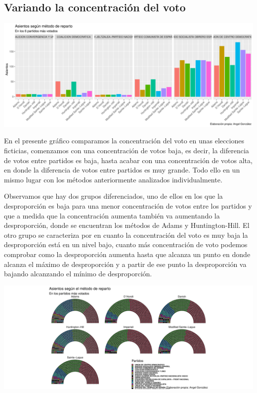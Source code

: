 \documentclass[12pt,a4paper,]{book}
\numberwithin{dummy}{section}
\theoremstyle{ocrenumbox}
\theoremstyle{blacknumex}
\theoremstyle{blacknumbox}
\theoremstyle{ocrenum}
\theoremstyle{ocrenum}
\begin{document}
\hypertarget{variando-la-concentraciuxf3n-del-voto}{%
\subsection{Variando la concentración del
voto}\label{variando-la-concentraciuxf3n-del-voto}}

\begin{center}\includegraphics[width=0.95\linewidth]{figurasR/unnamed-chunk-68-1} \end{center}

En el presente gráfico comparamos la concentración del voto en unas
elecciones ficticias, comenzamos con una concentración de votos baja, es
decir, la diferencia de votos entre partidos es baja, hasta acabar con
una concentración de votos alta, en donde la diferencia de votos entre
partidos es muy grande. Todo ello en un mismo lugar con los métodos
anteriormente analizados individualmente.

Observamos que hay dos grupos diferenciados, uno de ellos en los que la
desproporción es baja para una menor concentración de votos entre los
partidos y que a medida que la concentración aumenta también va
aumentando la desproporción, donde se encuentran los métodos de Adams y
Huntington-Hill. El otro grupo se caracteriza por en cuanto la
concentración del voto es muy baja la desproporción está en un nivel
bajo, cuanto más concentración de voto podemos comprobar como la
desproporción aumenta hasta que alcanza un punto en donde alcanza el
máximo de desproporción y a partir de ese punto la desproporción va
bajando alcanzando el mínimo de desproporción.

\begin{center}\includegraphics[width=0.95\linewidth]{figurasR/unnamed-chunk-69-1} \end{center}
\end{document}
